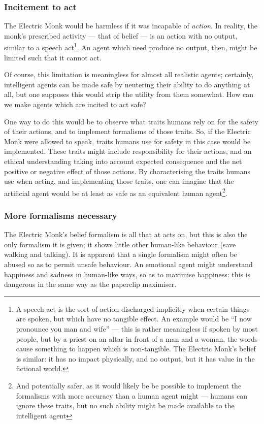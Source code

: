 \subsubsection{Incitement to act}
The Electric Monk would be harmless if it was incapable of \emph{action}. In reality, the monk's prescribed activity --- that of belief --- is an action with no output, similar to a speech act\footnote{A speech act is the sort of action discharged implicitly when certain things are spoken, but which have no tangible effect. An example would be ``I now pronounce you man and wife'' --- this is rather meaningless if spoken by most people, but by a priest on an altar in front of a man and a woman, the words cause something to happen which is non-tangible. The Electric Monk's belief is similar: it has no impact physically, and no output, but it has value in the fictional world.}. An agent which need produce no output, then, might be limited such that it cannot act.\par

Of course, this limitation is meaningless for almost all realistic agents; certainly, intelligent agents can be made safe by neutering their ability to do anything at all, but one supposes this would strip the utility from them somewhat. How can we make agents which are incited to act safe?\par

One way to do this would be to observe what traits humans rely on for the safety of their actions, and to implement formalisms of those traits. So, if the Electric Monk were allowed to speak, traits humans use for safety in this case would be implemented. These traits might include responsibility for their actions, and an ethical understanding taking into account expected consequence and the net positive or negative effect of those actions. By characterising the traits humans use when acting, and implementing those traits, one can imagine that the artificial agent would be at least as safe as an equivalent human agent\footnote{And potentially safer, as it would likely be be possible to implement the formalisms with more accuracy than a human agent might --- humans can ignore these traits, but no such ability might be made available to the intelligent agent}.\par

\subsubsection{More formalisms necessary}
The Electric Monk's belief formalism is all that at acts on, but this is also the only formalism it is given; it shows little other human-like behaviour (save walking and talking). It is apparent that a single formalism might often be abused so as to permit unsafe behaviour. An emotional agent might understand happiness and sadness in human-like ways, so as to maximise happiness: this is dangerous in the same way as the paperclip maximiser.\par


